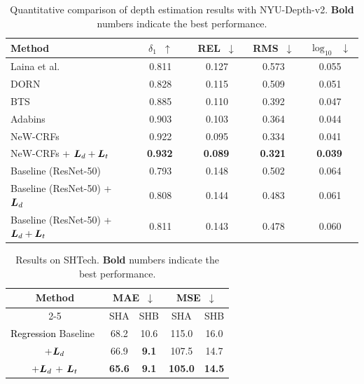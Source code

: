 \documentclass{article} %
\def\shihao{\textcolor{black}}
\begin{document}
\begin{table}[t]
	\caption{{Quantitative comparison} of depth estimation results with NYU-Depth-v2. \textbf{Bold} numbers indicate the best performance.}
	\label{tab:nyu}
	\centering
		\begin{tabular}{l|cccc}
			\hline
			\multirow{1}[0]{*}{Method}
			& $\delta_1$~$\uparrow$ & REL~$\downarrow$ & RMS~$\downarrow$ & $\log_{10}$~$\downarrow$ \\
			\hline
			Laina et al. \citep{laina2016deeper} & 0.811 & 0.127 & 0.573 & 0.055  \\
			DORN \citep{fu2018deep} & 0.828 & 0.115 & 0.509 & 0.051  \\
			BTS \citep{lee2019big} & 0.885  & 0.110 & 0.392 & 0.047  \\
			Adabins \citep{bhat2021adabins} & 0.903 & 0.103 & 0.364 & 0.044 \\
			\midrule
			NeW-CRFs \citep{yuan2022new} & 0.922  & 0.095 & 0.334 & 0.041 \\
			NeW-CRFs + ${\bm{L}}_d + {\bm{L}}_t$ & ~~\bf{0.932}~~ & ~~\bf{0.089}~~ & ~~\bf{0.321}~~ &~~\bf{0.039}~~\\
			Baseline (ResNet-50) & 0.793  & 0.148 & 0.502 & 0.064\\
			Baseline (ResNet-50) + ${\bm{L}}_d$ & 0.808 & 0.144 & 0.483 & 0.061\\
			Baseline (ResNet-50) + ${\bm{L}}_d + {\bm{L}}_t$ & {0.811} & {0.143} & {0.478} & {0.060}\\
			\hline
		\end{tabular}
\end{table}

\begin{table}[t]
	\caption{Results on SHTech. \textbf{Bold} numbers indicate the best performance.}
	\label{tab:counting}
	\centering
		\begin{tabular}{c|cc|cc}
			\hline
			\multirow{2}[0]{*}{Method} & \multicolumn{2}{c|}{MAE~$\downarrow$} & \multicolumn{2}{c}{MSE~$\downarrow$}  \\
 			\cline{2-5}
			& SHA & SHB &  SHA & SHB\\
			\hline
			\shihao{Regression} Baseline~\citep{li2018csrnet} & 68.2 & 10.6 & 115.0 & 16.0 \\
			+${\bm{L}}_d$ & 66.9 & \textbf{9.1} & 107.5 & 14.7 \\
			+${\bm{L}}_d$ + ${\bm{L}}_t$ & \textbf{65.6} & \textbf{9.1} & \textbf{105.0} & \textbf{14.5} \\
			\hline
		\end{tabular}
\end{table}
\end{document}
